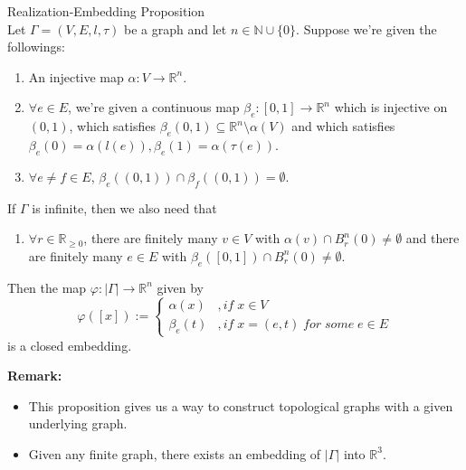 \begin{proposition}{Realization-Embedding Proposition}\\
Let $\Gamma=(V,E,l,\tau)$ be a graph and let $n \in \mathbb{N} \cup \{0\}$. Suppose we're given the followings:
\begin{enumerate}
    \item An injective map $\alpha: V \to \mathbb{R}^n$.
    \item $\forall e\in E$, we're given a continuous map $\beta_e: [0,1] \to \mathbb{R}^n$ which is injective on $(0,1)$, which satisfies $\beta_e(0,1) \subseteq \mathbb{R}^n \setminus \alpha(V)$ and which satisfies $\beta_e (0)= \alpha(l(e)), \beta_e(1)= \alpha(\tau(e))$.
    \item $\forall e\neq f \in E$, $\beta_e((0,1)) \cap \beta_f ((0,1)) =\emptyset$.
\end{enumerate}
If $\Gamma$ is infinite, then we also need that
\begin{enumerate}[resume]
    \item $\forall r \in \mathbb{R}_{\geq 0}$, there are finitely many $v \in V$ with $\alpha (v) \cap B_r^n(0) \neq \emptyset$ and there are finitely many $e \in E$ with $\beta_e ([0,1]) \cap B_r^n (0) \neq \emptyset$.
\end{enumerate}
Then the map $\varphi: |\Gamma| \to \mathbb{R}^n$ given by
$$\varphi([x]) := \begin{cases}
    \alpha(x) &,if\; x\in V\\
    \beta_e(t) &,if\; x=(e,t) \;for\;some\;e \in E
\end{cases}$$
is a closed embedding.
\end{proposition}

\noindent\textbf{Remark:} \begin{itemize}
    \item This proposition gives us a way to construct topological graphs with a given underlying graph.
    \item Given any finite graph, there exists an embedding of $|\Gamma|$ into $\mathbb{R}^3$.
\end{itemize}

